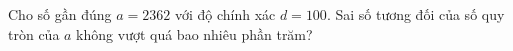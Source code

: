 \begin{ex}
Cho số gần đúng $a=2362$ với độ chính xác $d=100$. Sai số tương đối của số quy tròn của $a$ không vượt quá bao nhiêu phần trăm?
\end{ex}
